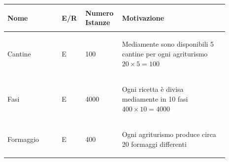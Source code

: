 \documentclass[12pt,a4paper]{article}
\begin{document}
\begin{center}
\setlength{\extrarowheight}{1.5pt}
\begin{longtable}{|p{0.23\linewidth}|p{0.1\linewidth}|p{0.11\linewidth}|p{0.45\linewidth}|}
\hline \textbf{Nome} 	& \begin{center}\vspace{-15pt}\textbf{E/R}\end{center} & \textbf{Numero Istanze} & \textbf{Motivazione}\\ 

    
\hline
Cantine 				& \begin{center}
\vspace{-25pt}E
\end{center}
					& \begin{center}
					\vspace{-25pt}100\end{center}
					& \begin{flushleft}\vspace{-25pt} Mediamente sono disponibili 5 cantine per ogni agriturismo $20\times 5=100$ \end{flushleft}\\ 

\hline
Fasi 				& \begin{center}
\vspace{-25pt}E
\end{center}
					& \begin{center}
					\vspace{-25pt}4000\end{center}
					& \begin{flushleft}\vspace{-25pt} Ogni ricetta è divisa mediamente in 10 fasi $400\times 10 = 4000$\end{flushleft}\\ 

\hline
Formaggio 				& \begin{center}
\vspace{-25pt}E
\end{center}
					& \begin{center}
					\vspace{-25pt}400\end{center}
					& \begin{flushleft}\vspace{-25pt} Ogni agriturismo produce circa 20 formaggi differenti \end{flushleft}\\ 


\end{longtable}
\end{center}
\end{document}
